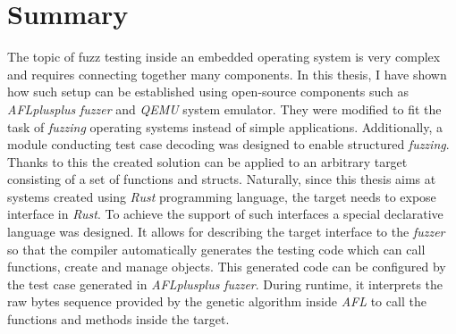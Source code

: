 \cleardoublepage
\section{Summary} \label{chap:summ}
The topic of fuzz testing inside an embedded operating system is very complex and requires connecting together many components. In this thesis, I have shown how such setup can be established using open-source components such as \textit{AFLplusplus} \textit{fuzzer} and \textit{QEMU} system emulator. They were modified to fit the task of \textit{fuzzing} operating systems instead of simple applications. Additionally, a module conducting test case decoding was designed to enable structured \textit{fuzzing}. Thanks to this the created solution can be applied to an arbitrary target consisting of a set of functions and structs. Naturally, since this thesis aims at systems created using \textit{Rust} programming language, the target needs to expose interface in \textit{Rust}. To achieve the support of such interfaces a special declarative language was designed. It allows for describing the target interface to the \textit{fuzzer} so that the compiler automatically generates the testing code which can call functions, create and manage objects. This generated code can be configured by the test case generated in \textit{AFLplusplus} \textit{fuzzer}. During runtime, it interprets the raw bytes sequence provided by the genetic algorithm inside \textit{AFL} to call the functions and methods inside the target.

